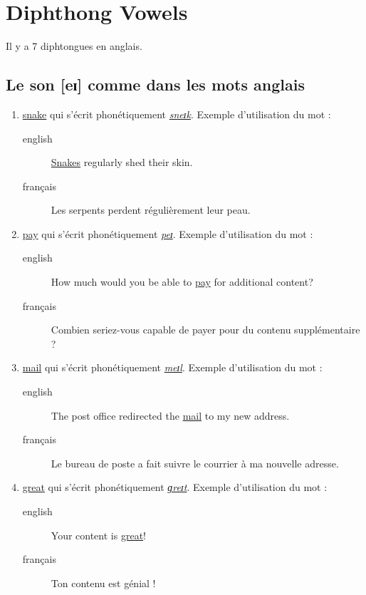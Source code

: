 \documentclass[12pt,a4paper]{book}
\begin{document}
\section{Diphthong Vowels}
\label{sec:orgbc226d9}
Il y a 7 diphtongues en anglais.
\subsection{Le son [eɪ] comme dans les mots anglais}
\label{sec:orgccc0406}
\begin{enumerate}
\item \href{http://www.wordreference.com/enfr/snake}{snake} qui s'écrit phonétiquement \href{https://en.oxforddictionaries.com/definition/snake}{\emph{sneɪk}}. Exemple d'utilisation du mot :
\begin{description}
\item[{english}] \textenglish{\href{https://youtu.be/MOltIVdyAHQ}{Snakes} regularly shed their skin.}
\item[{français}] Les serpents perdent régulièrement leur peau.
\end{description}
\item \href{http://www.wordreference.com/enfr/pay}{pay} qui s'écrit phonétiquement \href{https://en.oxforddictionaries.com/definition/pay}{\emph{peɪ}}. Exemple d'utilisation du mot : 
\begin{description}
\item[{english}] \textenglish{How much would you be able to \href{https://youtu.be/mBuLm5XeF44}{pay} for additional
content?}
\item[{français}] Combien seriez-vous capable de payer pour du contenu
supplémentaire ?
\end{description}
\item \href{http://www.wordreference.com/enfr/mail}{mail} qui s'écrit phonétiquement \href{https://en.oxforddictionaries.com/definition/mail}{\emph{meɪl}}. Exemple d'utilisation du mot :
\begin{description}
\item[{english}] \textenglish{The post office redirected the \href{https://youtu.be/KX1CSSZa1v0}{mail} to my new address.}
\item[{français}] Le bureau de poste a fait suivre le courrier à ma
nouvelle adresse.
\end{description}
\item \href{http://www.wordreference.com/enfr/great}{great} qui s'écrit phonétiquement \href{https://en.oxforddictionaries.com/definition/great}{\emph{ɡreɪt}}. Exemple d'utilisation du mot :
\begin{description}
\item[{english}] \textenglish{Your content is \href{https://youtu.be/e0qM84DWXzA}{great}!}
\item[{français}] Ton contenu est génial !
\end{description}
\end{enumerate}
\end{document}
